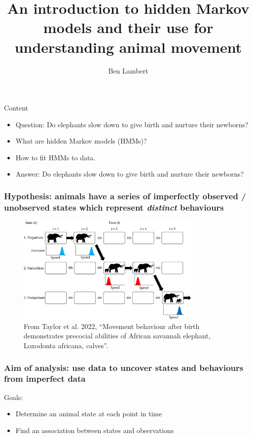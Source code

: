 \documentclass{beamer}
\title[] %
{An introduction to hidden Markov models and their use for understanding animal movement}
\date{}
\author[Lambert] %
{Ben Lambert}
\begin{document}
\frame{\titlepage}

\begin{frame}{Content}

\begin{itemize}
    \item Question: Do elephants slow down to give birth and nurture their newborns?
    \item What are hidden Markov models (HMMs)?
    \item How to fit HMMs to data.
    \item Answer: Do elephants slow down to give birth and nurture their newborns? 
\end{itemize}
    
\end{frame}

\begin{frame}
\frametitle{Hypothesis: animals have a series of imperfectly observed / unobserved states which represent \textit{distinct} behaviours}

\begin{figure}
    \centering
    \includegraphics[width=0.8\textwidth]{figures/elephant_parturition.jpg}
    \caption{From Taylor et al. 2022, ``Movement behaviour after birth demonstrates precocial abilities of African savannah elephant, Loxodonta africana, calves''.}
    \label{fig:enter-label}
\end{figure}

\end{frame}

\begin{frame}
\frametitle{Aim of analysis: use data to uncover states and behaviours from imperfect data}

Goals:

\begin{itemize}
    \item Determine an animal state at each point in time
    \item Find an association between states and observations
\end{itemize}
    
\end{frame}
\end{document}
